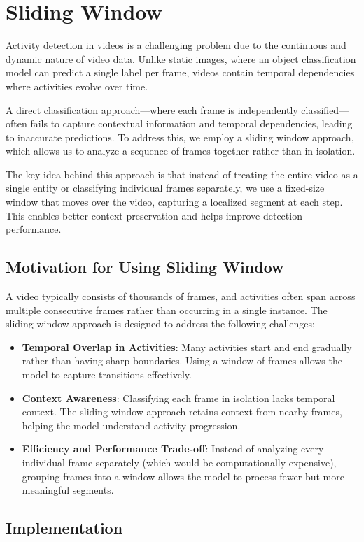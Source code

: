 \documentclass{article}
\begin{document}
\section{Sliding Window}
Activity detection in videos is a challenging problem due to the continuous and dynamic nature of video data. Unlike static images, where an object classification model can predict a single label per frame, videos contain temporal dependencies where activities evolve over time.

A direct classification approach—where each frame is independently classified—often fails to capture contextual information and temporal dependencies, leading to inaccurate predictions. To address this, we employ a sliding window approach, which allows us to analyze a sequence of frames together rather than in isolation.

The key idea behind this approach is that instead of treating the entire video as a single entity or classifying individual frames separately, we use a fixed-size window that moves over the video, capturing a localized segment at each step. This enables better context preservation and helps improve detection performance.

\subsection{Motivation for Using Sliding Window}
A video typically consists of thousands of frames, and activities often span across multiple consecutive frames rather than occurring in a single instance. The sliding window approach is designed to address the following challenges:
\begin{itemize}
    \item \textbf{Temporal Overlap in Activities}: Many activities start and end gradually rather than having sharp boundaries. Using a window of frames allows the model to capture transitions effectively.
    \item \textbf{Context Awareness}: Classifying each frame in isolation lacks temporal context. The sliding window approach retains context from nearby frames, helping the model understand activity progression.
    \item \textbf{Efficiency and Performance Trade-off}: Instead of analyzing every individual frame separately (which would be computationally expensive), grouping frames into a window allows the model to process fewer but more meaningful segments.
\end{itemize}
\subsection{Implementation}
\end{document}
